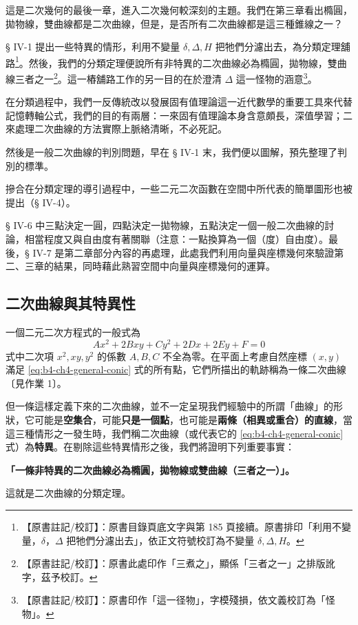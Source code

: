 這是二次幾何的最後一章，進入二次幾何較深刻的主題。我們在第三章看出橢圓，拋物線，雙曲線都是二次曲線，但是，是否所有二次曲線都是這三種錐線之一？

§ IV-1 提出一些特異的情形，利用不變量 $\delta, \Delta, H$ 把牠們分濾出去，為分類定理舖路\label{note:b4-ch4-intro-pulu}\footnote{【原書註記/校訂】：原書目錄頁底文字與第 185 頁接續。原書排印「利用不變量，$\delta$，$\Delta$ 把牠們分濾出去」，依正文符號校訂為不變量 $\delta, \Delta, H$。}。然後，我們的分類定理便說所有非特異的二次曲線必為橢圓，拋物線，雙曲線三者之一\label{note:b4-ch4-intro-sanzhe}\footnote{【原書註記/校訂】：原書此處印作「三煮之」，顯係「三者之一」之排版訛字，茲予校訂。}。這一樁舖路工作的另一目的在於澄清 $\Delta$ 這一怪物的涵意\label{note:b4-ch4-intro-guaiwu}\footnote{【原書註記/校訂】：原書印作「這一径物」，字模殘損，依文義校訂為「怪物」。}。

在分類過程中，我們一反傳統改以發展固有值理論這一近代數學的重要工具來代替記憶轉軸公式，我們的目的有兩層：一來固有值理論本身含意頗長，深值學習；二來處理二次曲線的方法實際上脈絡清晰，不必死記。

然後是一般二次曲線的判別問題，早在 § IV-1 末，我們便以圖解，預先整理了判別的標準。

摻合在分類定理的導引過程中，一些二元二次函數在空間中所代表的簡單圖形也被提出（§ IV-4）。

§ IV-6 中三點決定一圓，四點決定一拋物線，五點決定一個一般二次曲線的討論，相當程度又與自由度有著關聯（注意：一點換算為一個（度）自由度）。最後，§ IV-7 是第二章部分內容的再處理，此處我們利用向量與座標幾何來驗證第二、三章的結果，同時藉此熟習空間中向量與座標幾何的運算。


\subsection{二次曲線與其特異性}\label{sec:b4-4-1}

一個二元二次方程式的一般式為
\begin{equation}
Ax^2 + 2Bxy + Cy^2 + 2Dx + 2Ey + F = 0
\label{eq:b4-ch4-general-conic}
\end{equation}
式中二次項 $x^2, xy, y^2$ 的係數 $A, B, C$ 不全為零。在平面上考慮自然座標 $(x,y)$ 滿足 \eqref{eq:b4-ch4-general-conic} 式的所有點，它們所描出的軌跡稱為一條二次曲線〔見作業 1〕。

但一條這樣定義下來的二次曲線，並不一定呈現我們經驗中的所謂「曲線」的形狀，它可能是\textbf{空集合}，可能\textbf{只是一個點}，也可能是\textbf{兩條（相異或重合）的直線}，當這三種情形之一發生時，我們稱二次曲線（或代表它的 \eqref{eq:b4-ch4-general-conic} 式）為\textbf{特異}。在剔除這些特異情形之後，我們將證明下列重要事實：
\begin{center}
\textbf{「一條非特異的二次曲線必為橢圓，拋物線或雙曲線（三者之一）」。}
\end{center}
這就是二次曲線的分類定理。

